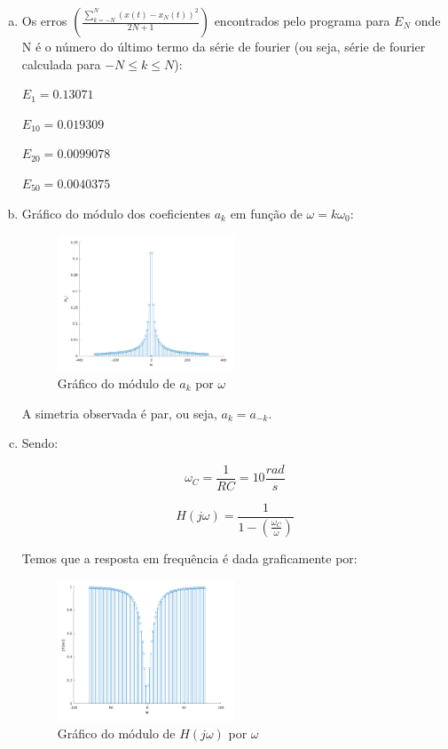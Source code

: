 \documentclass{article}
\begin{document}
\begin{enumerate}[(a)]
\item 
    Os erros $\left ( \frac{\sum\limits _{k = -N} ^{N} (x(t) - x_N(t))^2}{2N+1} \right )$ encontrados pelo programa para $E_N$ onde N é o número do último termo da série de fourier (ou seja, série de fourier calculada para $-N \leq k \leq N$):
\hfill\break

$E_1 = 0.13071$

$E_{10} = 0.019309$

$E_{20} = 0.0099078$

$E_{50} = 0.0040375$

\break\hfill

\item

Gráfico do módulo dos coeficientes $a_k$ em função de $\omega = k \omega _0$:

\begin{figure}[H]
\centering
\includegraphics[width=0.5\textwidth]{images/ak_x_w.png}
    \caption{Gráfico do módulo de $a_k$ por $\omega$}
\end{figure}

A simetria observada é par, ou seja, $a_k = a_{-k}$.

\item

Sendo:

\begin{equation}
    \omega_C = \frac{1}{RC} = 10 \frac{rad}{s}
\end{equation}

\begin{equation}
    H(j \omega) = \frac{1}{1 - \left ( \frac{\omega_C}{\omega} \right )}
\end{equation}

Temos que a resposta em frequência é dada graficamente por:

\begin{figure}[H]
\centering
\includegraphics[width=0.5\textwidth]{images/abs_x_w.png}
    \caption{Gráfico do módulo de $H(j\omega)$ por $\omega$}
\end{figure}


\end{enumerate}
\end{document}
